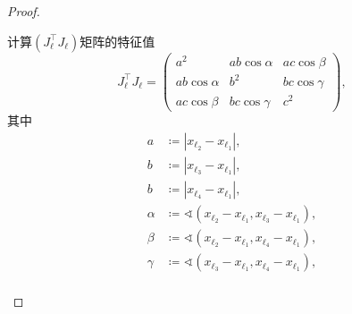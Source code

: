 \begin{proof}
\begin{enumerate}
计算$\left( J_{\ell}^{\top} J_{\ell} \right)$矩阵的特征值
\begin{equation*}
  J_{\ell}^{\top} J_{\ell} =
  \begin{pmatrix}
    a^{2} & a b \cos \alpha & a c \cos \beta \\
    a b \cos \alpha & b^{2} & b c \cos \gamma \\
    a c \cos \beta & b c \cos \gamma & c^{2}
  \end{pmatrix},
\end{equation*}
其中
\begin{equation*}
  \begin{split}
    a & \coloneqq \left| x_{\ell_{2}} - x_{\ell_{1}} \right|, \\
    b & \coloneqq \left| x_{\ell_{3}} - x_{\ell_{1}} \right|, \\
    b & \coloneqq \left| x_{\ell_{4}} - x_{\ell_{1}} \right|, \\
    \alpha & \coloneqq \sphericalangle
    \left(
    x_{\ell_{2}} - x_{\ell_{1}},
    x_{\ell_{3}} - x_{\ell_{1}}
    \right), \\
    \beta & \coloneqq \sphericalangle
    \left(
    x_{\ell_{2}} - x_{\ell_{1}},
    x_{\ell_{4}} - x_{\ell_{1}}
    \right), \\
    \gamma & \coloneqq \sphericalangle
    \left(
    x_{\ell_{3}} - x_{\ell_{1}},
    x_{\ell_{4}} - x_{\ell_{1}}
    \right), \\
  \end{split}
\end{equation*}


\end{enumerate}
\end{proof}
